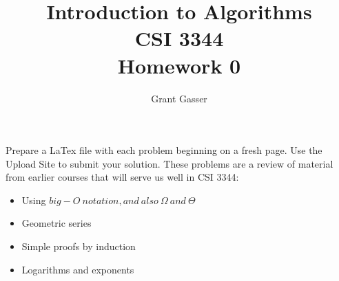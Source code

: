 \documentclass[12pt]{article}
\title{Introduction to Algorithms\\CSI 3344\\ Homework 0}
\author{Grant Gasser}
\begin{document}
\maketitle 

Prepare a LaTex file with each problem beginning on a fresh page.
Use the Upload Site to submit your solution. These problems are a review of material from earlier courses that will serve us well in CSI 3344:

\begin{itemize}
	\item Using $big-O ~notation, and ~also ~\Omega ~and ~\Theta$
	\item Geometric series
	\item Simple proofs by induction 
	\item Logarithms and exponents 
\end{itemize}
\end{document}
